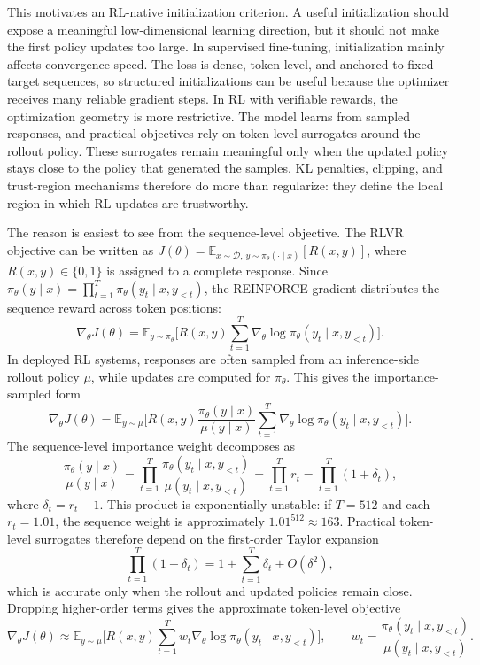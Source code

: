 \documentclass{llmxive}
\begin{document}
This motivates an RL-native initialization criterion. A useful initialization should expose a
meaningful low-dimensional learning direction, but it should not make the first policy updates
too large. In supervised fine-tuning, initialization mainly affects convergence speed. The loss is
dense, token-level, and anchored to fixed target sequences, so structured initializations can be
useful because the optimizer receives many reliable gradient steps. In RL with verifiable rewards,
the optimization geometry is more restrictive. The model learns from sampled responses, and
practical objectives rely on token-level surrogates around the rollout policy. These surrogates
remain meaningful only when the updated policy stays close to the policy that generated the
samples. KL penalties, clipping, and trust-region mechanisms therefore do more than regularize:
they define the local region in which RL updates are trustworthy.

The reason is easiest to see from the sequence-level objective. The RLVR objective can be
written as \(J(\theta)=\mathbb{E}_{x\sim\mathcal{D},\,y\sim\pi_\theta(\cdot\mid x)}[R(x,y)]\),
where \(R(x,y)\in\{0,1\}\) is assigned to a complete response. Since
\(\pi_\theta(y\mid x)=\prod_{t=1}^{T}\pi_\theta(y_t\mid x,y_{<t})\), the REINFORCE
gradient \citep{williams1992reinforce} distributes the sequence reward across token positions:
\[
    \nabla_\theta J(\theta)
    =
    \mathbb{E}_{y\sim\pi_\theta}
    \biggl[
        R(x,y)
        \sum_{t=1}^{T}
        \nabla_\theta \log \pi_\theta(y_t\mid x,y_{<t})
    \biggr].
\]
In deployed RL systems, responses are often sampled from an inference-side rollout policy
\(\mu\), while updates are computed for \(\pi_\theta\). This gives the importance-sampled form
\[
    \nabla_\theta J(\theta)
    =
    \mathbb{E}_{y\sim\mu}
    \biggl[
        R(x,y)
        \frac{\pi_\theta(y\mid x)}{\mu(y\mid x)}
        \sum_{t=1}^{T}
        \nabla_\theta \log \pi_\theta(y_t\mid x,y_{<t})
    \biggr].
\]
The sequence-level importance weight decomposes as
\[
    \frac{\pi_\theta(y\mid x)}{\mu(y\mid x)}
    =
    \prod_{t=1}^{T}
    \frac{\pi_\theta(y_t\mid x,y_{<t})}
         {\mu(y_t\mid x,y_{<t})}
    =
    \prod_{t=1}^{T}r_t
    =
    \prod_{t=1}^{T}(1+\delta_t),
\]
where \(\delta_t=r_t-1\). This product is exponentially unstable: if \(T=512\) and each
\(r_t=1.01\), the sequence weight is approximately \(1.01^{512}\approx163\). Practical
token-level surrogates therefore depend on the first-order Taylor expansion
\[
    \prod_{t=1}^{T}(1+\delta_t)
    =
    1+\sum_{t=1}^{T}\delta_t
    +
    O(\delta^2),
\]
which is accurate only when the rollout and updated policies remain close. Dropping higher-order
terms gives the approximate token-level objective \citep{zheng2025stabilizingrl}
\[
    \nabla_\theta J(\theta)
    \approx
    \mathbb{E}_{y\sim\mu}
    \biggl[
        R(x,y)
        \sum_{t=1}^{T}
        w_t
        \nabla_\theta \log \pi_\theta(y_t\mid x,y_{<t})
    \biggr],
    \qquad
    w_t=
    \frac{\pi_\theta(y_t\mid x,y_{<t})}
         {\mu(y_t\mid x,y_{<t})}.
\]
\end{document}
